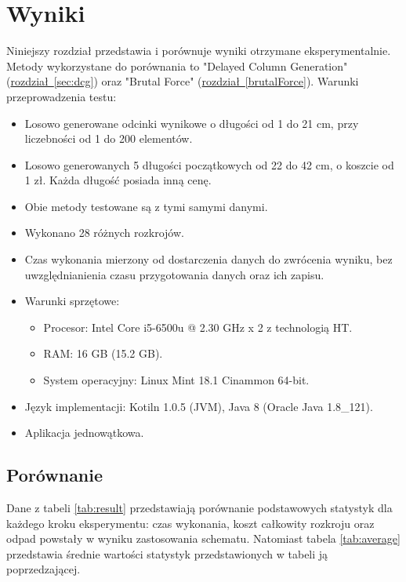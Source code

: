 \section{Wyniki}
\label{sec:results}

Niniejszy rozdział przedstawia i porównuje wyniki otrzymane eksperymentalnie. Metody wykorzystane do porównania to "Delayed Column Generation" (\hyperref[sec:dcg]{rozdział~\ref*{sec:dcg}}) oraz "Brutal Force" (\hyperref[brutalForce]{rozdział~\ref*{brutalForce}}). Warunki przeprowadzenia testu:
\begin{itemize}
  \item Losowo generowane odcinki wynikowe o długości od 1 do 21 cm, przy liczebności od 1 do 200 elementów.
  \item Losowo generowanych 5 długości początkowych od 22 do 42 cm, o koszcie od 1 zł. Każda długość posiada inną cenę.
  \item Obie metody testowane są z tymi samymi danymi.
  \item Wykonano 28 różnych rozkrojów.
  \item Czas wykonania mierzony od dostarczenia danych do zwrócenia wyniku, bez uwzględnianienia czasu przygotowania danych oraz ich zapisu.
  \item Warunki sprzętowe:
  \begin{itemize}
    \item Procesor: Intel Core i5-6500u @ 2.30 GHz x 2 z technologią HT.
    \item RAM: 16 GB (15.2 GB).
    \item System operacyjny: Linux Mint 18.1 Cinammon 64-bit.
  \end{itemize}
  \item Język implementacji: Kotiln 1.0.5 (JVM), Java 8 (Oracle Java 1.8\_121).
  \item Aplikacja jednowątkowa.
\end{itemize}
\subsection{Porównanie}

Dane z tabeli \ref{tab:result} przedstawiają porównanie podstawowych statystyk dla każdego kroku eksperymentu: czas wykonania, koszt całkowity rozkroju oraz odpad powstały w wyniku zastosowania schematu. Natomiast tabela \ref{tab:average} przedstawia średnie wartości statystyk przedstawionych w tabeli ją poprzedzającej.


